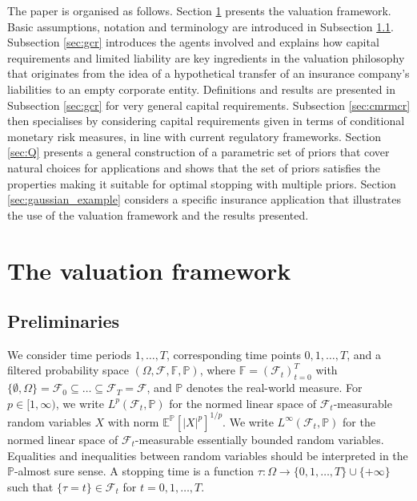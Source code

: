 \documentclass[11pt,a4paper]{article}
\newcommand{\E}{\mathbb{E}}
\renewcommand{\P}{\mathbb{P}}
\newcommand{\calF}{\mathcal{F}}
\newcommand{\filF}{\mathbb{F}}
\begin{document}
The paper is organised as follows. 
Section \ref{sec:framework} presents the valuation framework. Basic assumptions, notation and terminology are introduced in Subsection \ref{sec:prel}. Subsection \ref{sec:gcr} introduces the agents involved and explains how capital requirements and limited liability are key ingredients in the valuation philosophy that originates from the idea of a hypothetical transfer of an insurance company's liabilities to an empty corporate entity. 
Definitions and results are presented in Subsection \ref{sec:gcr} for very general capital requirements.  
Subsection \ref{sec:cmrmcr} then specialises by considering capital requirements given in terms of conditional monetary risk measures, in line with current regulatory frameworks. 
Section \ref{sec:Q} presents a general construction of a parametric set of priors that cover natural choices for applications and shows that the set of priors satisfies the properties making it suitable for optimal stopping with multiple priors. 
Section \ref{sec:gaussian_example} considers a specific insurance application that illustrates the use of the valuation framework and the results presented.  

\section{The valuation framework}\label{sec:framework}

\subsection{Preliminaries}\label{sec:prel}

We consider time periods $1,\dots,T$, corresponding time points $0,1,\dots,T$, and a filtered probability space $(\Omega,\calF,\filF,\P)$, where $\filF=(\calF_t)_{t=0}^{T}$ with $\{\emptyset, \Omega\}=\calF_0\subseteq \dots \subseteq \calF_{T}=\calF$, and $\P$ denotes the real-world measure. 
For $p\in [1,\infty)$, we write $L^p(\calF_t,\P)$ for the normed linear space of $\calF_t$-measurable random variables $X$ with norm $\E^{\P}[|X|^p]^{1/p}$. We write $L^{\infty}(\calF_t,\P)$ for the normed linear space of $\calF_t$-measurable essentially bounded random variables. 
Equalities and inequalities between random variables should be interpreted in the $\P$-almost sure sense. 
A stopping time is a function $\tau:\Omega\to\{0,1,\dots,T\}\cup \{+\infty\}$ such that $\{\tau=t\}\in\calF_t$ for $t=0,1,\dots,T$. 
\end{document}
